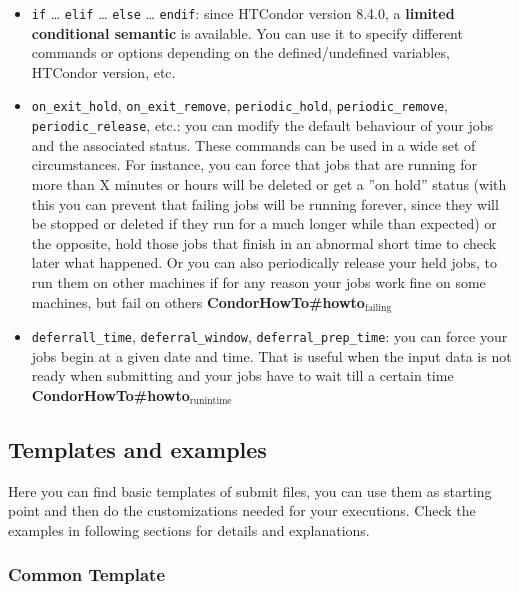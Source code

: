 \documentclass[a4paper,10pt]{article}
\begin{document}
\begin{itemize}
\begin{itemize}
\begin{itemize}
\item \texttt{if} \ldots{} \texttt{elif} \ldots{} \texttt{else} \ldots{}  \texttt{endif}: since HTCondor version 8.4.0, a
\textbf{limited conditional semantic} is available. You can use it to specify
different commands or options depending on the defined/undefined
variables, HTCondor version, etc.
\item \texttt{on\_exit\_hold}, \texttt{on\_exit\_remove}, \texttt{periodic\_hold}, \texttt{periodic\_remove},
\texttt{periodic\_release}, etc.: you can modify the default behaviour of your
jobs and the associated status. These commands can be used in a wide set
of circumstances. For instance, you can force that jobs that are running
for more than X minutes or hours will be deleted or get a ''on hold''
status (with this you can prevent that failing jobs will be running
forever, since they will be stopped or deleted if they run for a much
longer while than expected) or the opposite, hold those jobs that finish
in an abnormal short time to check later what happened. Or you can also
periodically release your held jobs, to run them on other machines if for
any reason your jobs work fine on some machines, but fail on others
\textbf{CondorHowTo\#howto\(_{\text{failing}}\)}
\item \texttt{deferrall\_time}, \texttt{deferral\_window}, \texttt{deferral\_prep\_time}: you can force
your jobs begin at a given date and time. That is useful when the input
data is not ready when submitting and your jobs have to wait till a
certain time \textbf{CondorHowTo\#howto\(_{\text{runintime}}\)}
\end{itemize}
\end{itemize}
\end{itemize}



\subsection{Templates and examples}
\label{sec:orgbd0c92d}

Here you can find basic templates of submit files, you can use them as starting
point and then do the customizations needed for your executions. Check the
examples in following sections for details and explanations.

\subsubsection{Common Template}
\label{sec:orge1b927a}
\end{document}
